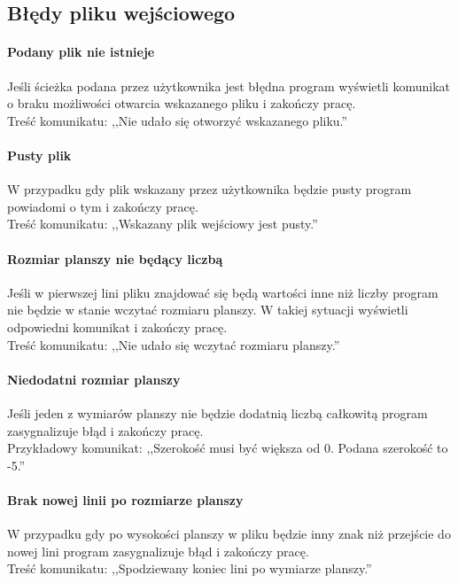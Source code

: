 \documentclass{report}
\begin{document}
\subsection{Błędy pliku wejściowego}

\paragraph{Podany plik nie istnieje}
Jeśli ścieżka podana przez użytkownika jest błędna program wyświetli komunikat o braku możliwości otwarcia wskazanego pliku i zakończy pracę. \\
Treść komunikatu: ,,Nie udało się otworzyć wskazanego pliku.''

\paragraph{Pusty plik}
W przypadku gdy plik wskazany przez użytkownika będzie pusty program powiadomi o tym i zakończy pracę. \\
Treść komunikatu: ,,Wskazany plik wejściowy jest pusty.''

\paragraph{Rozmiar planszy nie będący liczbą}
Jeśli w pierwszej lini pliku znajdować się będą wartości inne niż liczby program nie będzie w stanie wczytać rozmiaru planszy. W takiej sytuacji wyświetli odpowiedni komunikat i zakończy pracę. \\
 Treść komunikatu: ,,Nie udało się wczytać rozmiaru planszy.''
 
 \paragraph{Niedodatni rozmiar planszy}
 Jeśli jeden z wymiarów planszy nie będzie dodatnią liczbą całkowitą program zasygnalizuje błąd i zakończy pracę. \\
 Przykładowy komunikat: ,,Szerokość musi być większa od 0. Podana szerokość to -5.''
 
 \paragraph{Brak nowej linii po rozmiarze planszy}
 W przypadku gdy po wysokości planszy w pliku będzie inny znak niż przejście do nowej lini program zasygnalizuje błąd i zakończy pracę. \\
 Treść komunikatu: ,,Spodziewany koniec lini po wymiarze planszy.''
 
\end{document}
